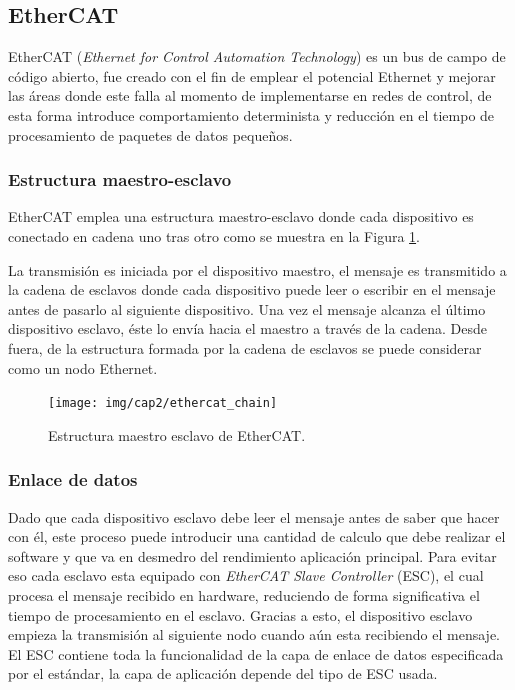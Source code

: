 \subsection{EtherCAT}

EtherCAT (\textit{Ethernet for Control Automation Technology}) es un bus de campo de código abierto, fue creado con el fin de emplear el potencial Ethernet y mejorar las áreas donde este falla al momento de implementarse en redes de control, de esta forma introduce comportamiento determinista y reducción en el tiempo de procesamiento de paquetes de datos pequeños.

\subsubsection{Estructura maestro-esclavo}

EtherCAT emplea una estructura maestro-esclavo donde cada dispositivo es conectado en cadena uno tras otro como se muestra en la Figura \ref{cap2_ethercat_chain}.

La transmisión es iniciada por el dispositivo maestro, el mensaje es transmitido a la cadena de esclavos donde cada dispositivo puede leer o escribir en el mensaje antes de pasarlo al siguiente dispositivo. Una vez el mensaje alcanza el último dispositivo esclavo, éste lo envía hacia el maestro a través de la cadena. Desde fuera, de la estructura formada por la cadena de esclavos se puede considerar como un nodo Ethernet.

\begin{figure}[ht]
  \centering
  \texttt{[image: img/cap2/ethercat\_chain]}
  \caption{Estructura maestro esclavo de EtherCAT.}
  \label{cap2_ethercat_chain}
\end{figure}

\subsubsection{Enlace de datos}

Dado que cada dispositivo esclavo debe leer el mensaje antes de saber que hacer con él, este proceso puede introducir una cantidad de calculo que debe realizar el software y que va en desmedro del rendimiento aplicación principal. Para evitar eso cada esclavo esta equipado con \textit{EtherCAT Slave Controller} (ESC), el cual procesa el mensaje recibido en hardware, reduciendo de forma significativa el tiempo de procesamiento en el esclavo. Gracias a esto, el dispositivo esclavo empieza la transmisión al siguiente nodo cuando aún esta recibiendo el mensaje. El ESC contiene toda la funcionalidad de la capa de enlace de datos especificada por el estándar, la capa de aplicación depende del tipo de ESC usada.

